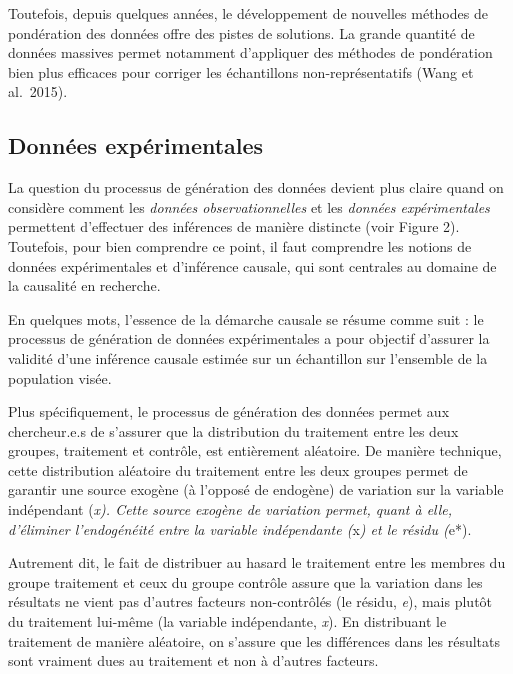 \documentclass[
  letterpaper,
  DIV=11,
  numbers=noendperiod]{scrreprt}
\begin{document}
Toutefois, depuis quelques années, le développement de nouvelles
méthodes de pondération des données offre des pistes de solutions. La
grande quantité de données massives permet notamment d'appliquer des
méthodes de pondération bien plus efficaces pour corriger les
échantillons non-représentatifs (Wang et al.~2015).

\hypertarget{donnuxe9es-expuxe9rimentales}{%
\subsection*{Données
expérimentales}\label{donnuxe9es-expuxe9rimentales}}

La question du processus de génération des données devient plus claire
quand on considère comment les \emph{données observationnelles} et les
\emph{données expérimentales} permettent d'effectuer des inférences de
manière distincte (voir Figure 2). Toutefois, pour bien comprendre ce
point, il faut comprendre les notions de données expérimentales et
d'inférence causale, qui sont centrales au domaine de la causalité en
recherche.

En quelques mots, l'essence de la démarche causale se résume comme suit
: le processus de génération de données expérimentales a pour objectif
d'assurer la validité d'une inférence causale estimée sur un échantillon
sur l'ensemble de la population visée.

Plus spécifiquement, le processus de génération des données permet aux
chercheur.e.s de s'assurer que la distribution du traitement entre les
deux groupes, traitement et contrôle, est entièrement aléatoire. De
manière technique, cette distribution aléatoire du traitement entre les
deux groupes permet de garantir une source exogène (à l'opposé de
endogène) de variation sur la variable indépendant (\emph{x). Cette
source exogène de variation permet, quant à elle, d'éliminer
l'endogénéité entre la variable indépendante (}x\emph{) et le résidu
(}e*).

Autrement dit, le fait de distribuer au hasard le traitement entre les
membres du groupe traitement et ceux du groupe contrôle assure que la
variation dans les résultats ne vient pas d'autres facteurs
non-contrôlés (le résidu, \emph{e}), mais plutôt du traitement lui-même
(la variable indépendante, \emph{x}). En distribuant le traitement de
manière aléatoire, on s'assure que les différences dans les résultats
sont vraiment dues au traitement et non à d'autres facteurs.
\end{document}
